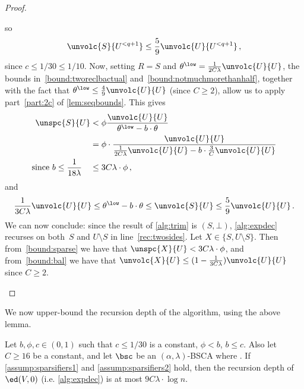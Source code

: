 \begin{proof}
\begin{itemize}
\begin{equation*}
		\end{equation*}
		so
		\begin{equation}
			\label{bound:notmuchmorethanhalf}
			\unvolc{S}{U^{<q+1}} \le \frac{5}{9}\unvolc{U}{U^{<q+1}} \, ,
		\end{equation}
	since $c \le 1/30 \le  1/10$. Now, setting $R=S$ and $\theta^{\low}=\frac{1}{2C\lambda} \unvolc{U}{U}$, the bounds in~\eqref{bound:tworeclbactual} and~\eqref{bound:notmuchmorethanhalf}, together with the fact that $\theta^{\low}  \le \frac{4}{9}\unvolc{U}{U}$ (since $C \ge 2$), allow us to apply part~\eqref{part:2c} of \cref{lem:seqbounds}. This gives
	\begin{align}
		\unspc{S}{U} & < \phi \frac{\unvolc{U}{U}}{\theta^{\low}-b\cdot \theta} \\
		& = \phi \cdot \frac{\unvolc{U}{U}}{\frac{1}{2C\lambda}\unvolc{U}{U}- b \cdot \frac{3}{C}\unvolc{U}{U}} \\
		\text{since $b \le \frac{1}{18 \lambda}$}\quad & \le 3C\lambda \cdot \phi \label{bound:sparse} \, , 
	\end{align}
	and
	\begin{equation}
		\frac{1}{3C\lambda}\unvolc{U}{U} \le \theta^{\low}-b\cdot \theta \le \unvolc{S}{U} \le \frac{5}{9} \unvolc{U}{U} \, .  \label{bound:bal}
	\end{equation}
	We can now conclude: since the result of \cref{alg:trim} is $(S,\bot)$, \cref{alg:expdec} recurses on both~$S$ and $U \setminus S$ in line~\eqref{rec:twosides}. Let $X \in \{S,U\setminus S\}$. Then from~\eqref{bound:sparse} we have that $\unspc{X}{U} < 3C\lambda \cdot \phi$, and from~\eqref{bound:bal} we have that $\unvolc{X}{U} \le (1-\frac{1}{3C\lambda}) \unvolc{U}{U}$ since $C \ge 2$.
	
	\end{itemize}
\end{proof}

\noindent
We now upper-bound the recursion depth of the algorithm, using the above lemma.

\begin{lemma}
	\label{lem:bounddepth}
	Let $b, \phi,c \in (0,1)$ such that $c \le 1/30$ is a constant, $\phi < b$, $b \le c$. Also let $C \ge 16$ be a constant, and let $\bsc$ be an $(\alpha,\lambda)$-BSCA where . If \cref{assump:sparsifiers1} and \cref{assump:sparsifiers2} hold, then the recursion depth of $\ed(V,0)$ (i.e. \cref{alg:expdec}) is at most $9C\lambda \cdot \log n $.
\end{lemma}

